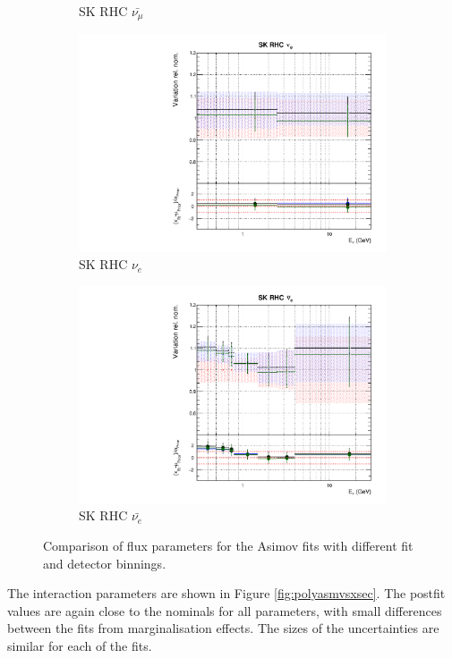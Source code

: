 \begin{figure}
\begin{subfigure}{0.24\textwidth}
  \caption{SK RHC $\bar{\nu_{\mu}}$}
\end{subfigure}
\begin{subfigure}{0.24\textwidth}
  \centering
  \includegraphics[width=0.95\linewidth]{figs/polyasmvsflux_14}
  \caption{SK RHC $\nu_{e}$}
\end{subfigure}
\begin{subfigure}{0.24\textwidth}
  \centering
  \includegraphics[width=0.95\linewidth]{figs/polyasmvsflux_15}
  \caption{SK RHC $\bar{\nu_e}$}
\end{subfigure}
\caption{Comparison of flux parameters for the Asimov fits with different fit and detector binnings.}
\label{fig:polyasmvsflux}
\end{figure}

The interaction parameters are shown in Figure \ref{fig:polyasmvsxsec}. The postfit values are again close to the nominals for all parameters, with small differences between the fits from marginalisation effects. The sizes of the uncertainties are similar for each of the fits.

